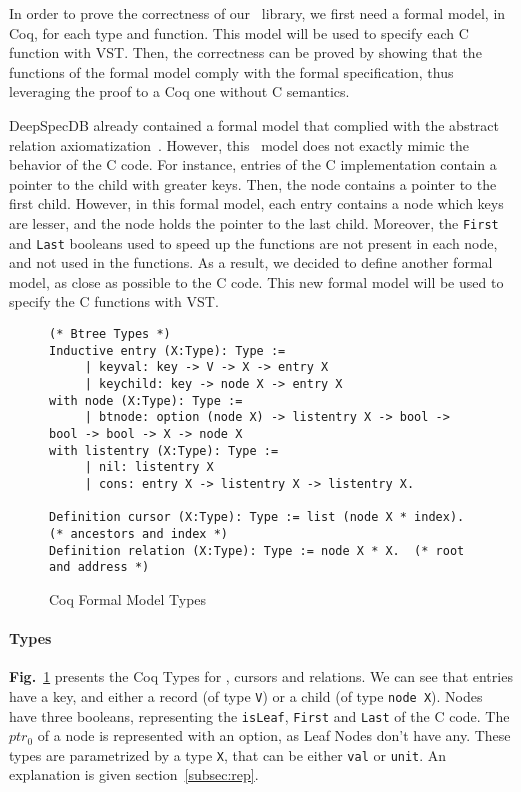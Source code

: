 In order to prove the correctness of our \btrees\ library, we first need a formal model, in Coq, for each type and function.
This model will be used to specify each C function with VST.
Then, the correctness can be proved by showing that the functions of the formal model comply with the formal specification, thus leveraging the proof to a Coq one without C semantics.

DeepSpecDB already contained a formal model that complied with the abstract relation axiomatization~\cite{brian}.
However, this \btree\ model does not exactly mimic the behavior of the C code.
For instance, entries of the C implementation contain a pointer to the child with greater keys.
Then, the node contains a pointer to the first child.
However, in this formal model, each entry contains a node which keys are lesser, and the node holds the pointer to the last child.
Moreover, the \texttt{First} and \texttt{Last} booleans used to speed up the functions are not present in each node, and not used in the functions.
As a result, we decided to define another formal model, as close as possible to the C code.
This new formal model will be used to specify the C functions with VST.


\begin{figure}
\begin{lstlisting}[language=Coq]
(* Btree Types *)
Inductive entry (X:Type): Type :=
     | keyval: key -> V -> X -> entry X
     | keychild: key -> node X -> entry X
with node (X:Type): Type :=
     | btnode: option (node X) -> listentry X -> bool -> bool -> bool -> X -> node X
with listentry (X:Type): Type :=
     | nil: listentry X
     | cons: entry X -> listentry X -> listentry X.

Definition cursor (X:Type): Type := list (node X * index). (* ancestors and index *)
Definition relation (X:Type): Type := node X * X.  (* root and address *)
\end{lstlisting}
\label{coqtypes}
\caption{Coq Formal Model Types}
\end{figure}

\paragraph{Types}\textbf{Fig.}~\ref{coqtypes} presents the Coq Types for \btrees, cursors and relations. 
We can see that entries have a key, and either a record (of type \texttt{V}) or a child (of type \texttt{node X}).
Nodes have three booleans, representing the \texttt{isLeaf}, \texttt{First} and \texttt{Last} of the C code.
The $ptr_0$ of a node is represented with an option, as Leaf Nodes don't have any.
These types are parametrized by a type \texttt{X}, that can be either \texttt{val} or \texttt{unit}.
An explanation is given section~\ref{subsec:rep}.

